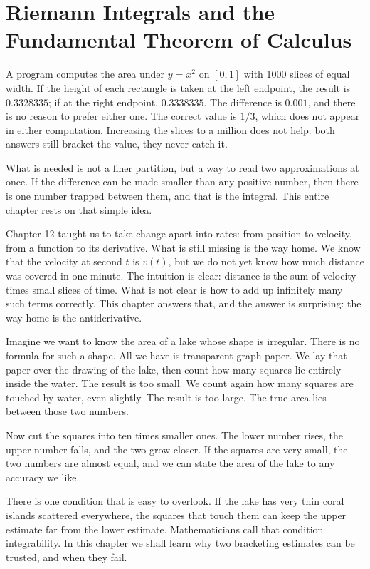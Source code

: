\chapter{Riemann Integrals and the Fundamental Theorem of Calculus}

A program computes the area under $y=x^2$ on $[0,1]$ with 1000 slices of equal
width. If the height of each rectangle is taken at the left endpoint, the result is $0.3328335$; if at
the right endpoint, $0.3338335$. The difference is $0.001$, and there is no reason to prefer either one.
The correct value is $1/3$, which does not appear in either computation. Increasing the slices to a
million does not help: both answers still bracket the value, they never catch it.

What is needed is not a finer partition, but a way to read two approximations at
once. If the difference can be made smaller than any positive number,
then there is one number trapped between them, and that is the integral. This entire
chapter rests on that simple idea.

Chapter 12 taught us to take change apart into rates: from position to velocity,
from a function to its derivative. What is still missing is the way home. We know that the velocity at
second $t$ is $v(t)$, but we do not yet know how much distance was covered in one
minute. The intuition is clear: distance is the sum of velocity times small slices of time.
What is not clear is how to add up infinitely many such terms correctly.
This chapter answers that, and the answer is surprising: the way home is the antiderivative.

\begin{untukanak}
Imagine we want to know the area of a lake whose shape is irregular. There is no
formula for such a shape. All we have is transparent graph paper. We
lay that paper over the drawing of the lake, then count how many squares lie entirely
inside the water. The result is too small. We count again how many squares are
touched by water, even slightly. The result is too large. The true area lies
between those two numbers.

Now cut the squares into ten times smaller ones. The lower number rises, the upper number
falls, and the two grow closer. If the squares are very small, the two numbers are almost equal,
and we can state the area of the lake to any accuracy we like.

There is one condition that is easy to overlook. If the lake has very thin coral islands
scattered everywhere, the squares that touch them can keep the upper estimate far
from the lower estimate. Mathematicians call that condition integrability. In this chapter we
shall learn why two bracketing estimates can be trusted, and when they fail.
\end{untukanak}


